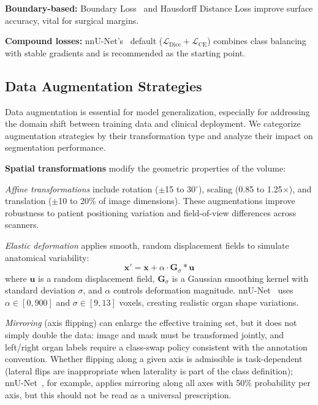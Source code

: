 \textbf{Boundary-based:} Boundary Loss~\cite{kervadec2019boundary} and Hausdorff Distance Loss improve surface accuracy, vital for surgical margins.

\textbf{Compound losses:} nnU-Net's~\cite{isensee2021nnunet} default ($\mathcal{L}_{\text{Dice}} + \mathcal{L}_{\text{CE}}$) combines class balancing with stable gradients and is recommended as the starting point.

\subsection{Data Augmentation Strategies}
\label{sec:augmentation}

Data augmentation is essential for model generalization, especially for addressing the domain shift between training data and clinical deployment. We categorize augmentation strategies by their transformation type and analyze their impact on segmentation performance.

\textbf{Spatial transformations} modify the geometric properties of the volume:

\emph{Affine transformations} include rotation ($\pm$15 to 30$^\circ$), scaling (0.85 to 1.25$\times$), and translation ($\pm$10 to 20\% of image dimensions). These augmentations improve robustness to patient positioning variation and field-of-view differences across scanners.

\emph{Elastic deformation} applies smooth, random displacement fields to simulate anatomical variability:
\begin{equation*}
\mathbf{x}' = \mathbf{x} + \alpha \cdot \mathbf{G}_\sigma * \mathbf{u}
\end{equation*}
where $\mathbf{u}$ is a random displacement field, $\mathbf{G}_\sigma$ is a Gaussian smoothing kernel with standard deviation $\sigma$, and $\alpha$ controls deformation magnitude. nnU-Net~\cite{isensee2021nnunet} uses $\alpha \in [0, 900]$ and $\sigma \in [9, 13]$ voxels, creating realistic organ shape variations.

\emph{Mirroring} (axis flipping) can enlarge the effective training set, but it does not simply double the data: image and mask must be transformed jointly, and left/right organ labels require a class-swap policy consistent with the annotation convention. Whether flipping along a given axis is admissible is task-dependent (lateral flips are inappropriate when laterality is part of the class definition); nnU-Net~\cite{isensee2021nnunet}, for example, applies mirroring along all axes with 50\% probability per axis, but this should not be read as a universal prescription.

